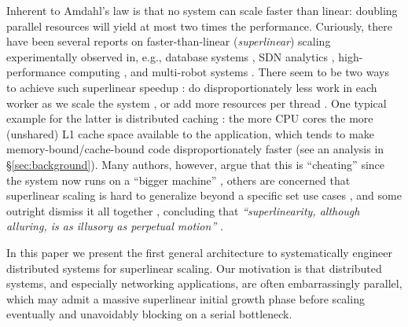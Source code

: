 Inherent to Amdahl's law is that no system can scale faster than linear: doubling parallel resources will yield at most two times the performance. Curiously, there have been several reports on faster-than-linear (\emph{superlinear}) scaling experimentally observed in, e.g., database systems \cite{scalability-analyzed, 10.5555/1012889.1012894}, SDN analytics \cite{sdn-analytitcs}, high-performance computing \cite{556383, 7733347, 6483679}, and multi-robot systems \cite{10.1007/978-3-319-77610-1}. There seem to be two ways to achieve such superlinear speedup \cite{7733347, 80148}: do disproportionately less work in each worker as we scale the system \cite{7733347}, or add more resources per thread \cite{80148}. One typical example for the latter is distributed caching \cite{271208, 10.5555/1012889.1012894}: the more CPU cores the more (unshared) L1 cache space available to the application, which tends to make memory-bound\slash cache-bound code disproportionately faster \cite{80148} (see an analysis in \S\ref{sec:background}).  Many authors, however, argue that this is ``cheating'' \cite{gunther-hotsos, 10.1145/2773212.2789974} since the system now runs on a ``bigger machine'' \cite{80148}, others are concerned that superlinear scaling is hard to generalize beyond a specific set use cases \cite{7733347, 80148}, and some outright dismiss it all together \cite{gunther-hotsos, 10.1016/0167-8191(86)90024-4}, concluding that \emph{``superlinearity, although alluring, is as illusory as perpetual motion''} \cite{10.1145/2773212.2789974}.

In this paper we present the first general architecture to systematically engineer distributed systems for superlinear scaling. Our motivation is that distributed systems, and especially networking applications, are often embarrassingly parallel, %
which may admit a massive superlinear initial growth phase before scaling eventually and unavoidably blocking on a serial bottleneck.

